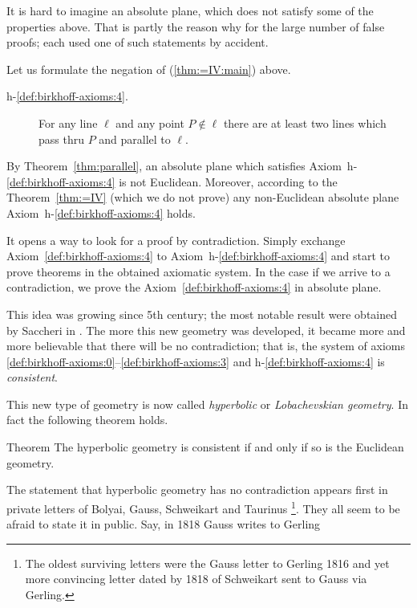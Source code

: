 It is hard to imagine an absolute plane, which does not satisfy some of the properties above.
That is partly the reason why for the large number of false proofs;
each used one of such statements by accident.

Let us formulate the negation of (\ref{thm:=IV:main}) above.

\medskip

\begin{description}
\item[{\rm h-$\!$\ref{def:birkhoff-axioms:4}.}]\label{def:hyperbolic-4a}  
For any line $\ell$ and any point $P\notin\ell$ 
there are at least two lines which pass thru $P$ 
and parallel to $\ell$.
\end{description}

\medskip

By Theorem~\ref{thm:parallel}, an absolute plane which satisfies Axiom~h-$\!$\ref{def:birkhoff-axioms:4} is not Euclidean. 
Moreover, according to the Theorem~\ref{thm:=IV} (which we do not prove) 
any non-Euclidean absolute plane Axiom~h-$\!$\ref{def:birkhoff-axioms:4} holds.

It opens a way to look for a proof by contradiction.
Simply exchange  Axiom~\ref{def:birkhoff-axioms:4} to Axiom~h-$\!$\ref{def:birkhoff-axioms:4}
 and start to prove theorems in the obtained axiomatic system.
In the case if we arrive to a contradiction, 
we prove the Axiom~\ref{def:birkhoff-axioms:4} in absolute plane.  

This idea was growing since 5th century;
the most notable result were obtained by Saccheri in \cite{saccheri}.
The more this new geometry was developed,
it became more and more believable that there will be no contradiction;
that is, the system of axioms \ref{def:birkhoff-axioms:0}--\ref{def:birkhoff-axioms:3} and h-$\!$\ref{def:birkhoff-axioms:4} is \emph{consistent}.

This new type of geometry is now called \emph{hyperbolic} or  \emph{Lobachevskian geometry}.
In fact the following theorem holds.

\begin{thm}{Theorem}\label{thm:consistent}
The hyperbolic geometry is consistent if and only if so is the Euclidean geometry.
\end{thm}

The statement
that hyperbolic geometry has no contradiction appears first in private letters of
Bolyai,  Gauss, Schweikart and Taurinus%
\footnote{The oldest surviving letters were the Gauss letter to Gerling 1816 
and yet more convincing letter dated by 1818 
of Schweikart sent to Gauss via Gerling.}.
They all seem to be afraid to state it in public.
Say, in 1818  
Gauss writes to Gerling


